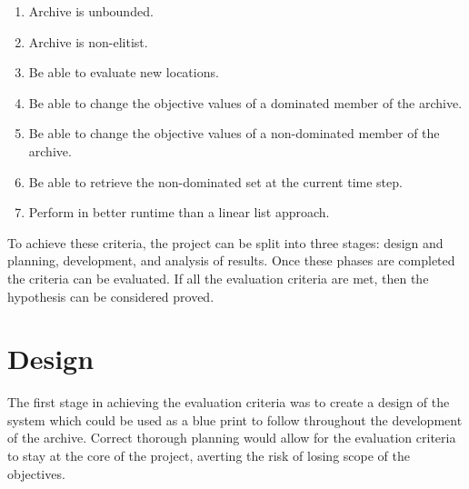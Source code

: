 \documentclass{ecmm427_assignment}
\begin{document}
\begin{enumerate}
    \itemsep-0mm
    \item Archive is unbounded.
    \item Archive is non-elitist.
    \item Be able to evaluate new locations.
    \item Be able to change the objective values of a dominated member of the archive.
    \item Be able to change the objective values of a non-dominated member of the archive.
    \item Be able to retrieve the non-dominated set at the current time step.
    \item Perform in better runtime than a linear list approach.
\end{enumerate}

To achieve these criteria, the project can be split into three stages: design and planning, development, and analysis of results. Once these phases are completed the criteria can be evaluated. If all the evaluation criteria are met, then the hypothesis can be considered proved.

\section{Design}
The first stage in achieving the evaluation criteria was to create a design of the system which could be used as a blue print to follow throughout the development of the archive. Correct thorough planning would allow for the evaluation criteria to stay at the core of the project, averting the risk of losing scope of the objectives.
\end{document}
